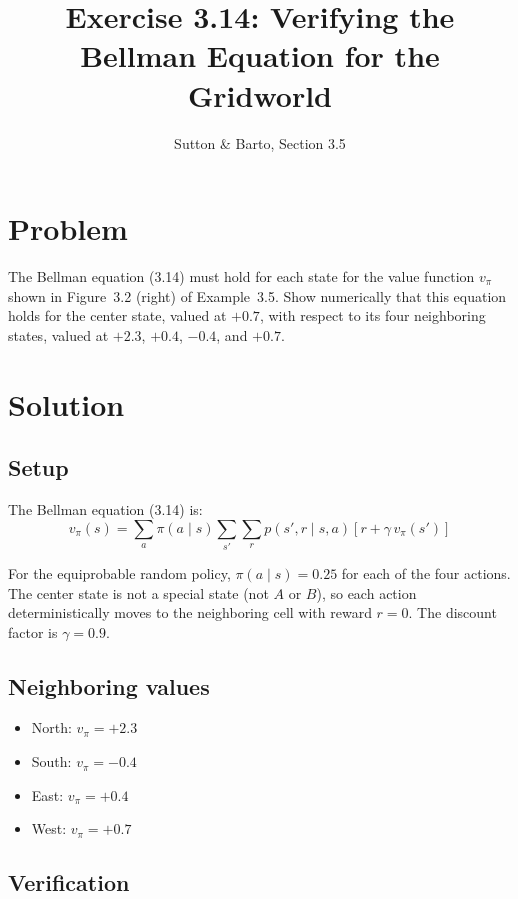 \documentclass[11pt]{article}
\title{Exercise 3.14: Verifying the Bellman Equation for the Gridworld}
\author{Sutton \& Barto, Section 3.5}
\date{}
\begin{document}
\maketitle

\section*{Problem}

The Bellman equation (3.14) must hold for each state for the value function
$v_\pi$ shown in Figure~3.2 (right) of Example~3.5. Show numerically that
this equation holds for the center state, valued at $+0.7$, with respect to
its four neighboring states, valued at $+2.3$, $+0.4$, $-0.4$, and $+0.7$.

\section*{Solution}

\subsection*{Setup}

The Bellman equation (3.14) is:
\[
    v_\pi(s) = \sum_{a} \pi(a \mid s) \sum_{s'} \sum_{r}
    p(s', r \mid s, a) \left[ r + \gamma\, v_\pi(s') \right]
\]

For the equiprobable random policy, $\pi(a \mid s) = 0.25$ for each of the
four actions. The center state is not a special state (not $A$ or $B$), so each
action deterministically moves to the neighboring cell with reward $r = 0$.
The discount factor is $\gamma = 0.9$.

\subsection*{Neighboring values}

\begin{itemize}
    \item North: $v_\pi = +2.3$
    \item South: $v_\pi = -0.4$
    \item East: $v_\pi = +0.4$
    \item West: $v_\pi = +0.7$
\end{itemize}

\subsection*{Verification}
\end{document}
